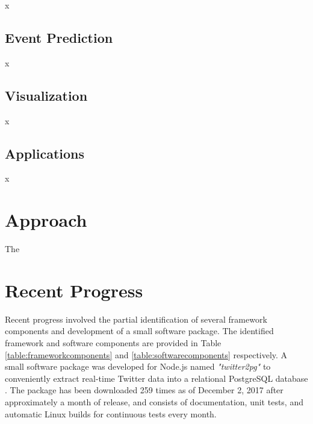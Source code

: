 x

\subsection{Event Prediction} \label{event-prediction}

x

\subsection{Visualization} \label{visualization}

x

\subsection{Applications} \label{applications}

x




\section{Approach} \label{approach}

The




\section{Recent Progress} \label{recent-progress}

Recent progress involved the partial identification of several framework components and development of a small software package. The identified framework and software components are provided in Table \ref{table:frameworkcomponents} and \ref{table:softwarecomponents} respectively. A small software package was developed for Node.js \citep{Nodejs:2017} named \textit{"twitter2pg"}  \citep{Wen:2017} to conveniently extract real-time Twitter data into a relational PostgreSQL database \citep{Postgresql:2017}. The package has been downloaded 259 times as of December 2, 2017 after approximately a month of release, and consists of documentation, unit tests, and automatic Linux builds for continuous tests every month.

